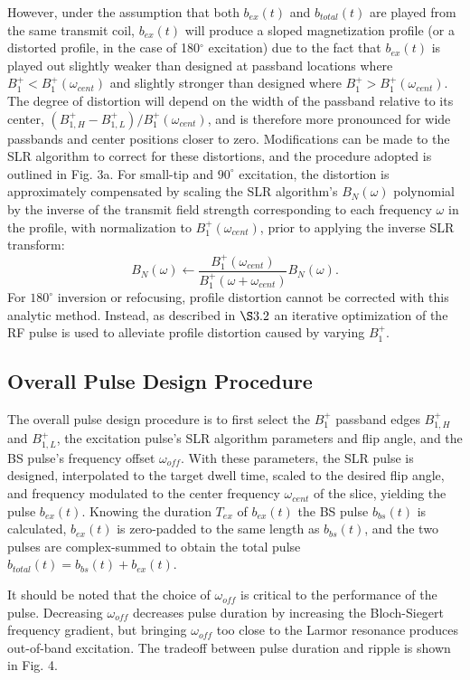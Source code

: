 \documentclass{article}
\newcommand{\bfullt}{b_{total}(t)}
\newcommand{\bext}{b_{ex}(t)}
\begin{document}
\par However, under the assumption that both $\bext$ and $\bfullt$ are played from the same transmit coil, 
 $\bext$ will produce a sloped magnetization profile (or a distorted profile, in the case of 180$^\circ$ excitation) due to the fact that $\bext$ is played out slightly weaker than designed at passband locations where $B_1^+ <  B_1^+(\omega_{cent})$ and slightly stronger than designed where $B_1^+ > B_1^+(\omega_{cent})$. 
The degree of distortion will depend on the width of the passband relative to its center, $(B_{1,H}^+ - B_{1,L}^+) / B_1^+(\omega_{cent})$, and is therefore more pronounced for wide passbands and center positions closer to zero. Modifications can be made to the SLR algorithm to correct for these distortions, and the procedure adopted is outlined in Fig. 3a.
For small-tip and $90^\circ$ excitation, 
the distortion is approximately compensated by scaling the SLR algorithm's $B_N(\omega)$ 
polynomial by the inverse of the transmit field strength corresponding to each frequency $\omega$ in the profile,
with normalization to $B_1^+(\omega_{cent})$, prior to applying the inverse SLR transform:
\begin{equation}
    B_N(\omega) \leftarrow \frac{B_1^+(\omega_{cent})}{B_1^+(\omega + \omega_{cent})}B_N(\omega).
\end{equation}
For $180^\circ$ inversion or refocusing,
profile distortion cannot be corrected with this analytic method. 
Instead, as described in $\S 3.2$ an iterative optimization of the RF pulse is used to alleviate 
profile distortion caused by varying $B_1^+$.

\subsection{Overall Pulse Design Procedure} 
The overall pulse design procedure is to first select the $B_1^+$ passband edges $B_{1,H}^+$ and $B_{1,L}^+$,
the excitation pulse's SLR algorithm parameters and flip angle, 
and the BS pulse's frequency offset $\omega_{off}$.
With these parameters, the SLR pulse is designed, interpolated to the target dwell time,
scaled to the desired flip angle, and frequency modulated to the center frequency $\omega_{cent}$ of the slice,
yielding the pulse $b_{ex}(t)$.
Knowing the duration $T_{ex}$ of $b_{ex}(t)$
the BS pulse $b_{bs}(t)$ is calculated,
$b_{ex}(t)$ is zero-padded to the same length as $b_{bs}(t)$,
and the two pulses are complex-summed to obtain the total pulse 
$b_{total}(t) = b_{bs}(t) + b_{ex}(t)$.
\par It should be noted that the choice of $\omega_{off}$ is critical to the performance of the pulse. Decreasing $\omega_{off}$ decreases pulse duration by increasing the Bloch-Siegert frequency gradient, but bringing $\omega_{off}$ too close to the Larmor resonance produces out-of-band excitation. The tradeoff between pulse duration and ripple is shown in Fig. 4.
\end{document}
